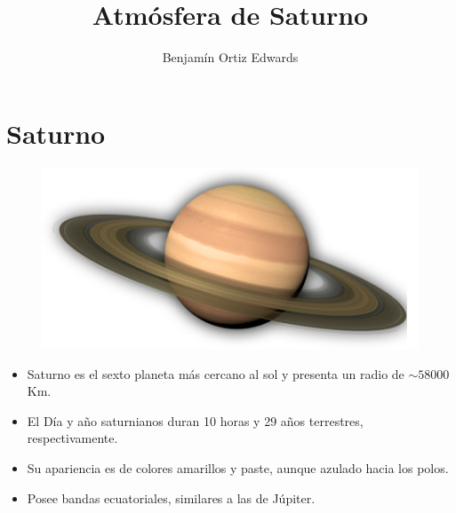 \documentclass{beamer}
\title{Atmósfera de Saturno}
\author{Benjamín Ortiz Edwards}
\begin{document}
\frame{\titlepage}

\section{Saturno}

\begin{frame}


\vspace{-2cm}
\begin{figure}
    \centering
    \includegraphics[width=0.6\linewidth]{saturn}
\end{figure}
\begin{itemize}
    \item Saturno es el sexto planeta más cercano al sol y presenta un radio de $\sim 58000$ Km.
    \item El Día y año saturnianos duran 10 horas y 29 años terrestres, respectivamente.
    \item Su apariencia es de colores amarillos y paste, aunque azulado hacia los polos.
    \item Posee bandas ecuatoriales, similares a las de Júpiter.
\end{itemize}
\end{frame}
\end{document}
